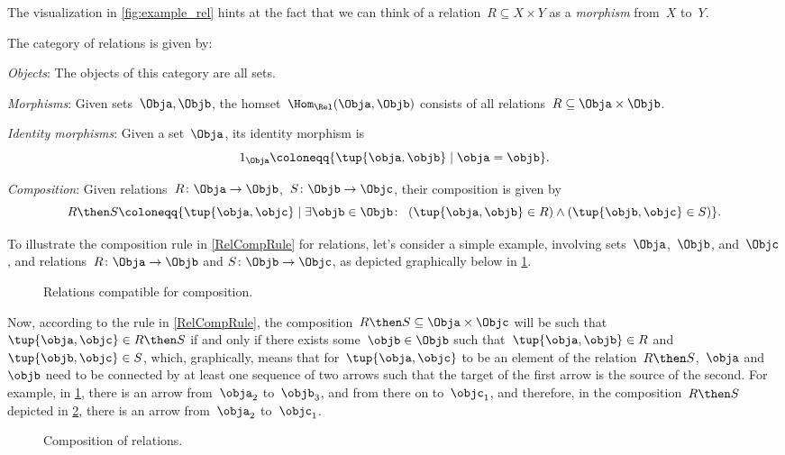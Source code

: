 The visualization in \cref{fig:example_rel} hints at the fact that we can think of a relation~$R \subseteq X \times Y$ as a \emph{morphism} from~$X$ to~$Y$.

\begin{ctdefinition}
    The category \iindex{\Rel} of relations \Rel is given by:
    \begin{compactenum}
        \item \emph{Objects}: The objects of this category are all sets.
        \item \emph{Morphisms}: Given sets~$\Obja, \Objb$, the homset~$\Hom_{\Rel}(\Obja,\Objb)$ consists of all
        relations~$R\subseteq \Obja\times \Objb$.
        \item \emph{Identity morphisms}: Given a set~$\Obja$, its identity morphism is
        \begin{equation}
            1_\Obja \coloneqq \{ \tup{\obja,\objb} \mid  \obja = \objb \}.
        \end{equation}
        \item \emph{Composition}: Given relations~$R \colon \Obja\to \Objb$,~$S\colon \Objb\to \Objc$, their composition is given by
        \begin{equation}
            \label{RelCompRule}
            R \then S \coloneqq \{\tup{\obja,\objc} \mid  \exists \objb \in \Objb \colon \ \left(\tup{\obja,\objb} \in R\right) \wedge \left(\tup{\objb,\objc} \in S\right)\}.
        \end{equation}
    \end{compactenum}
\end{ctdefinition}

To illustrate the composition rule in \cref{RelCompRule} for relations, let's consider a simple example, involving sets~$\Obja$,~$\Objb$, and~$\Objc$, and relations~$R \colon \Obja \to \Objb$ and $S \colon \Objb \to \Objc$, as depicted graphically below in \cref{fig:example_rel_composable}.
\begin{figure}[h!]
    \centering
    \caption{Relations compatible for composition.}
    \label{fig:example_rel_composable}
\end{figure}
Now, according to the rule in \cref{RelCompRule}, the composition~$R \then S \subseteq \Obja \times \Objc$ will be such that~$\tup{\obja,\objc} \in R \then S$ if and only if there exists some~$\objb \in \Objb$ such that~$\tup{\obja,\objb} \in R$ and~$\tup{\objb,\objc} \in S$, which, graphically, means that for~$\tup{\obja,\objc}$ to be an element of the relation~$R \then S$,~$\obja$ and~$\objb$ need to be connected by at least one sequence of two arrows such that the target of the first arrow is the source of the second. For example, in \cref{fig:example_rel_composable}, there is an arrow from~$\obja_2$ to~$\objb_3$, and from there on to~$\objc_1$, and therefore, in the composition~$R \then S$ depicted in \cref{fig:example_rel_composed}, there is an arrow from~$\obja_2$ to~$\objc_1$.
\begin{figure}[h!]
    \centering
    \caption{Composition of relations.}
    \label{fig:example_rel_composed}
\end{figure}

